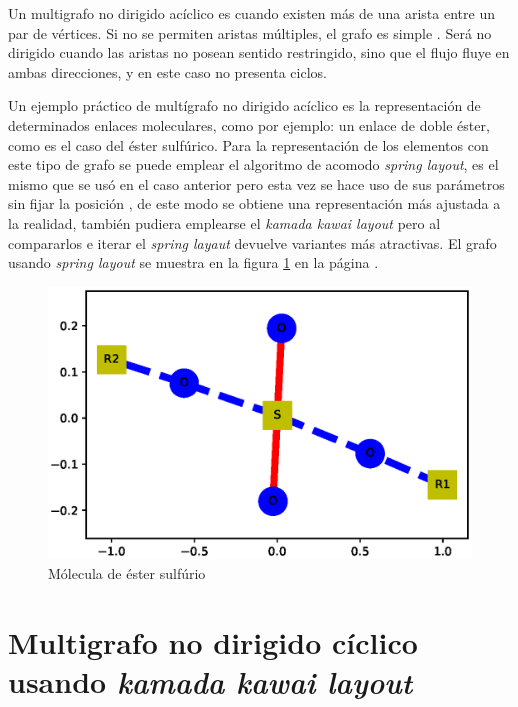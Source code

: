 \documentclass{article}
\begin{document}
Un multigrafo no dirigido acíclico es cuando existen más de una arista entre un par de vértices. Si no se permiten aristas múltiples, el grafo es simple \cite{Elisa}. Será no dirigido cuando las aristas no posean sentido restringido, sino que el flujo fluye en ambas direcciones, y en este caso no presenta ciclos.

Un ejemplo práctico de multígrafo no dirigido acíclico es la representación de determinados enlaces moleculares, como por ejemplo: un enlace de doble éster, como es el caso del éster sulfúrico. Para la representación de los elementos con este tipo de grafo se puede emplear el algoritmo de acomodo \textit{spring layout}, es el mismo que se usó en el caso anterior pero esta vez se hace uso de sus parámetros sin fijar la posición \cite{layout}, de este modo se obtiene una representación más ajustada a la realidad, también pudiera emplearse el \textit{kamada kawai layout} pero al compararlos e iterar el \textit{spring layaut} devuelve variantes más atractivas. El grafo usando \textit{spring layout} se muestra en la figura \ref{fig:Fig07} en la página \pageref{fig:Fig07}.

\newpage


\begin{figure}[h]
    \centering
    \includegraphics[scale=0.4]{imagenes1/Fig07.eps}
    \caption{Mólecula de éster sulfúrio}
    \label{fig:Fig07}
\end{figure}

\section{Multigrafo no dirigido cíclico usando \textit{kamada kawai layout}}
\end{document}
